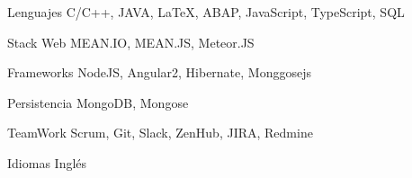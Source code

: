 


\begin{cvskills}


\cvskill
{Lenguajes} %
{C/C++, JAVA, \LaTeX{}, ABAP, JavaScript, TypeScript, SQL} %


\cvskill
{Stack Web} %
{MEAN.IO, MEAN.JS, Meteor.JS} %

\cvskill
{Frameworks} %
{NodeJS, Angular2, Hibernate, Monggosejs} %


\cvskill
{Persistencia} %
{MongoDB, Mongose} %

\cvskill
{TeamWork} %
{Scrum, Git, Slack, ZenHub, JIRA, Redmine} %

\cvskill
{Idiomas} %
{Inglés} %


\end{cvskills}
